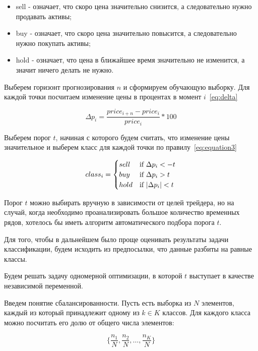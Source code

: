 \documentclass[a4paper,article,14pt]{extarticle}
\begin{document}
\begin{itemize}
    \item sell - означает, что скоро цена значительно снизится, а следовательно нужно продавать активы;
    \item buy - означает, что скоро цена значительно повысится, а следовательно нужно покупать активы;
    \item hold - означает, что цена в ближайшее время значительно не изменится, а значит ничего делать не нужно.
\end{itemize}

Выберем горизонт прогнозирования $n$ и сформируем обучающую выборку.
Для каждой точки посчитаем изменение цены в процентах в момент $i$~\eqref{eq:delta}

\begin{equation}
    \Delta p_i = \frac{price_{i + n} - price_{i}}{price_{i}} * 100
    \label{eq:delta}
\end{equation}

Выберем порог $t$, начиная с которого будем считать, что изменение цены значительное и выберем класс для каждой точки по правилу~\eqref{eq:equation3}

\begin{equation}
class_i =
 \begin{cases}
     sell &\text{if $ \Delta  p_i < -t$}
     \\
     buy &\text{if $\Delta p_i > t$}
     \\
     hold &\text{if $|\Delta p_i| < t$}
 \end{cases}
\label{eq:equation3}
\end{equation}

Порог $t$ можно выбирать вручную в зависимости от целей трейдера, но на случай, когда необходимо проанализировать большое количество временных рядов, хотелось бы иметь алгоритм автоматического подбора порога $t$.
\par
Для того, чтобы в дальнейшем было проще оценивать результаты задачи классификации, будем исходить из предпосылки, что данные разбиты на равные классы.

Будем решать задачу одномерной оптимизации, в которой $t$ выступает в качестве независимой переменной.

Введем понятие сбалансированности.
Пусть есть выборка из $N$ элементов, каждый из который принадлежит одному из $k \in K$ классов.
Для каждого класса можно посчитать его долю от общего числа элементов:

\begin{equation}
    \{ \frac{n_1}{N}, \frac{n_2}{N}, \dots , \frac{n_K}{N} \}
    \label{eq:fractions}
\end{equation}
\end{document}
